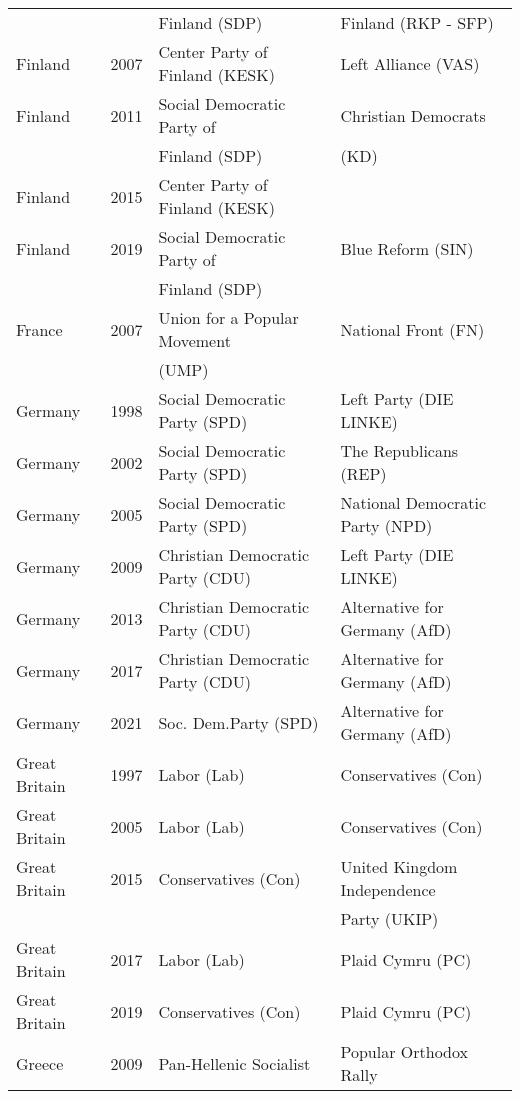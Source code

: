 {\begin{longtable}{|l|c|l|l|}
           &   &          Finland (SDP) &   Finland (RKP - SFP) \\ 
  Finland & 2007 &   Center Party of Finland (KESK) &   Left Alliance (VAS) \\ 
  Finland & 2011 &        Social  Democratic Party of   &   Christian Democrats   \\ 
         &       &         Finland (SDP) &     (KD) \\ 
  Finland & 2015 &   Center Party of Finland (KESK) &  \\ 
  Finland & 2019 &        Social Democratic Party of   &   Blue Reform (SIN)   \\ 
           &    &          Finland (SDP) &      \\ 
  France & 2007 &   Union for a Popular Movement     &   National Front (FN) \\ 
         &      &     (UMP)   &     \\ 
  Germany & 1998 &        Social Democratic Party (SPD) &   Left Party (DIE LINKE)   \\ 
  Germany & 2002 &        Social Democratic Party (SPD) &   The Republicans (REP) \\ 
  Germany & 2005 &        Social Democratic Party (SPD) &   National Democratic Party (NPD)   \\ 
Germany & 2009 &   Christian Democratic Party (CDU) &   Left Party (DIE LINKE)   \\ 
  Germany & 2013 &   Christian Democratic Party (CDU) &   Alternative for Germany (AfD) \\ 
  Germany & 2017 &   Christian Democratic Party (CDU) &   Alternative for Germany (AfD) \\ 
  Germany & 2021 &        Soc. Dem.Party (SPD) &   Alternative for Germany (AfD) \\ 
  Great Britain & 1997 &   Labor (Lab) &   Conservatives (Con) \\ 
  Great Britain & 2005 &   Labor (Lab) &   Conservatives (Con) \\ 
  Great Britain & 2015 &   Conservatives (Con) &   United Kingdom Independence  \\ 
    &   &     &    Party (UKIP) \\ 
  Great Britain & 2017 &   Labor (Lab) &   Plaid Cymru (PC)   \\ 
  Great Britain & 2019 &   Conservatives (Con) &   Plaid Cymru (PC)   \\ 
  Greece & 2009 & Pan-Hellenic Socialist   &  Popular Orthodox Rally  \\ 

\end{longtable}}
